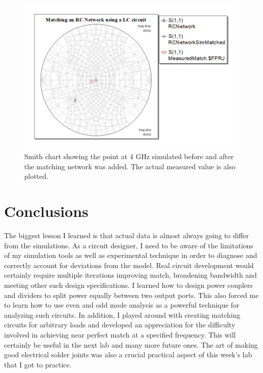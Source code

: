 \documentclass[twocolumn, aps, apl]{revtex4-1}
\begin{document}
\begin{figure}[!htbp]
    \centering
    \includegraphics[scale=0.4]{RCSmith.png}
    \caption{Smith chart showing the point at 4 GHz simulated before and after the matching network was added. The actual measured value is also plotted.}
    \label{fig:RCsmith}
\end{figure}

\section*{Conclusions}
The biggest lesson I learned is that actual data is almost always going to differ from the simulations. As a circuit designer, I need to be aware of the limitations of my simulation tools as well as experimental technique in order to diagnose and correctly account for deviations from the model. Real circuit development would certainly require multiple iterations improving match, broadening bandwidth and meeting other such design specifications. I learned how to design power couplers and dividers to split power equally between two output ports. This also forced me to learn how to use even and odd mode analysis as a powerful technique for analyzing such circuits. In addition, I played around with creating matching circuits for arbitrary loads and developed an appreciation for the difficulty involved in achieving near perfect match at a specified frequency. This will certainly be useful in the next lab and many more future ones. The art of making good electrical solder joints was also a crucial practical aspect of this week's lab that I got to practice. 
\end{document}

